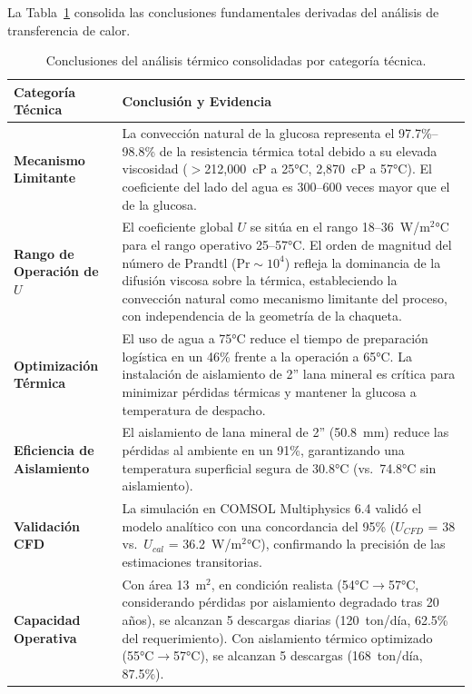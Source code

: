 La Tabla~\ref{tab:resumen_conclusiones_termicas} consolida las conclusiones fundamentales derivadas del análisis de transferencia de calor.

\begin{table}[H]
\centering
\caption{Conclusiones del análisis térmico consolidadas por categoría técnica.}
\label{tab:resumen_conclusiones_termicas}
\setcounter{itemcount}{0}
\begin{tabularx}{\textwidth}{@{}lX@{}}
\toprule
\textbf{Categoría Técnica} & \textbf{Conclusión y Evidencia} \\
\midrule
\textbf{Mecanismo Limitante} & La convección natural de la glucosa representa el 97.7\%--98.8\% de la resistencia térmica total debido a su elevada viscosidad ($>$212,000~cP a 25°C, 2,870~cP a 57°C). El coeficiente del lado del agua es 300--600 veces mayor que el de la glucosa. \\
\midrule
\textbf{Rango de Operación de $U$} & El coeficiente global $U$ se sitúa en el rango 18--36~W/m$^2$°C para el rango operativo 25--57°C. El orden de magnitud del número de Prandtl ($\mathrm{Pr} \sim 10^4$) refleja la dominancia de la difusión viscosa sobre la térmica, estableciendo la convección natural como mecanismo limitante del proceso, con independencia de la geometría de la chaqueta. \\
\midrule
\textbf{Optimización Térmica} & El uso de agua a 75°C reduce el tiempo de preparación logística en un 46\% frente a la operación a 65°C. La instalación de aislamiento de 2'' lana mineral es crítica para minimizar pérdidas térmicas y mantener la glucosa a temperatura de despacho. \\
\midrule
\textbf{Eficiencia de Aislamiento} & El aislamiento de lana mineral de 2'' (50.8~mm) reduce las pérdidas al ambiente en un 91\%, garantizando una temperatura superficial segura de 30.8°C (vs.~74.8°C sin aislamiento). \\
\midrule
\textbf{Validación CFD} & La simulación en COMSOL Multiphysics 6.4 validó el modelo analítico con una concordancia del 95\% ($U_{CFD}$ = 38 vs.~$U_{cal}$ = 36.2~W/m$^2$°C), confirmando la precisión de las estimaciones transitorias. \\
\midrule
\textbf{Capacidad Operativa} & Con área 13~m$^2$, en condición realista (54°C$\rightarrow$57°C, considerando pérdidas por aislamiento degradado tras 20 años), se alcanzan 5 descargas diarias (120~ton/día, 62.5\% del requerimiento). Con aislamiento térmico optimizado (55°C$\rightarrow$57°C), se alcanzan 5 descargas (168~ton/día, 87.5\%). \\
\bottomrule
\end{tabularx}
\end{table}

